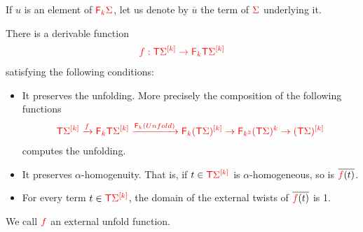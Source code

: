If $u$ is an element of $\ranked{\reduce k \Sigma}$, let us denote by $\overline{u}$ the term of $\ranked{\Sigma}$ underlying it.
\begin{lemma}\label{lem:unfold-external-twist}
There is a derivable function
\begin{align*}
\ranked{f:\tmonad \mati k \Sigma \to \reduce k \tmonad \mati k \Sigma}
\end{align*}
satisfying the following conditions:
\begin{itemize}
\item It preserves the unfolding. More precisely the composition of the following functions
\begin{align*}
\ranked{\tmonad \mati k \Sigma \xrightarrow{f} \reduce k \tmonad \mati k \Sigma \xrightarrow{\reduce k (Unfold)} \reduce k \mati k {(\tmonad\Sigma)} \to \reduce {k^2}  {(\tmonad\Sigma)}^k\to  \mati k {(\tmonad\Sigma)}}
\end{align*} 
computes the unfolding.
\item It preserves $\alpha$-homogenuity. That is, if $t\in\ranked{\tmonad\mati k \rSigma}$ is $\alpha$-homogeneous, so is $\overline{\ranked{f}(t)}$.
\item  For every term $t\in \ranked{\tmonad\mati k \rSigma}$, the domain of the external twists of $\overline{\ranked{f}(t)}$ is 1.
\end{itemize}
We call $\ranked{f}$ an external unfold function.
\end{lemma}
